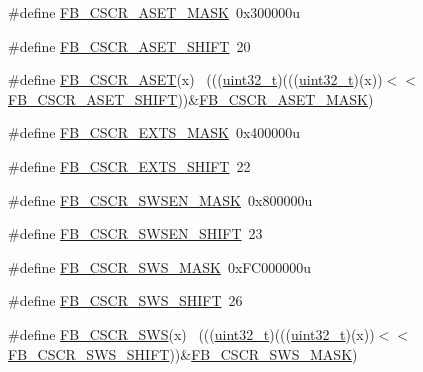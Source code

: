 \begin{DoxyCompactItemize}
\item 
\#define \hyperlink{group___f_b___register___masks_gaef9bac6317316a7b6d4e2df3526b206f}{F\+B\+\_\+\+C\+S\+C\+R\+\_\+\+A\+S\+E\+T\+\_\+\+M\+A\+SK}~0x300000u
\item 
\#define \hyperlink{group___f_b___register___masks_ga287d608bea3c47b85bdd3d707460da64}{F\+B\+\_\+\+C\+S\+C\+R\+\_\+\+A\+S\+E\+T\+\_\+\+S\+H\+I\+FT}~20
\item 
\#define \hyperlink{group___f_b___register___masks_gae8f1fb8db1ad4008018e37bb78c9338a}{F\+B\+\_\+\+C\+S\+C\+R\+\_\+\+A\+S\+ET}(x)                                                ~(((\hyperlink{_p_e___types_8h_a33594304e786b158f3fb30289278f5af}{uint32\+\_\+t})(((\hyperlink{_p_e___types_8h_a33594304e786b158f3fb30289278f5af}{uint32\+\_\+t})(x))$<$$<$\hyperlink{group___f_b___register___masks_ga287d608bea3c47b85bdd3d707460da64}{F\+B\+\_\+\+C\+S\+C\+R\+\_\+\+A\+S\+E\+T\+\_\+\+S\+H\+I\+FT}))\&\hyperlink{group___f_b___register___masks_gaef9bac6317316a7b6d4e2df3526b206f}{F\+B\+\_\+\+C\+S\+C\+R\+\_\+\+A\+S\+E\+T\+\_\+\+M\+A\+SK})
\item 
\#define \hyperlink{group___f_b___register___masks_ga1bc7960fd554faa076ba6e34fddaf081}{F\+B\+\_\+\+C\+S\+C\+R\+\_\+\+E\+X\+T\+S\+\_\+\+M\+A\+SK}~0x400000u
\item 
\#define \hyperlink{group___f_b___register___masks_ga095a10ba51cbcdf10aca9bf9d5692613}{F\+B\+\_\+\+C\+S\+C\+R\+\_\+\+E\+X\+T\+S\+\_\+\+S\+H\+I\+FT}~22
\item 
\#define \hyperlink{group___f_b___register___masks_ga38d5806081b68b58dff2b73abcab4d1a}{F\+B\+\_\+\+C\+S\+C\+R\+\_\+\+S\+W\+S\+E\+N\+\_\+\+M\+A\+SK}~0x800000u
\item 
\#define \hyperlink{group___f_b___register___masks_gad89987be24118d73c55bf5e97ab5e8d7}{F\+B\+\_\+\+C\+S\+C\+R\+\_\+\+S\+W\+S\+E\+N\+\_\+\+S\+H\+I\+FT}~23
\item 
\#define \hyperlink{group___f_b___register___masks_ga1036d22baaa692a66480d3ef93bc9729}{F\+B\+\_\+\+C\+S\+C\+R\+\_\+\+S\+W\+S\+\_\+\+M\+A\+SK}~0x\+F\+C000000u
\item 
\#define \hyperlink{group___f_b___register___masks_ga1ba720e1700a6ddc15457b55d8fbb376}{F\+B\+\_\+\+C\+S\+C\+R\+\_\+\+S\+W\+S\+\_\+\+S\+H\+I\+FT}~26
\item 
\#define \hyperlink{group___f_b___register___masks_ga88bb14898062706f58a15f988c6aad47}{F\+B\+\_\+\+C\+S\+C\+R\+\_\+\+S\+WS}(x)                                                  ~(((\hyperlink{_p_e___types_8h_a33594304e786b158f3fb30289278f5af}{uint32\+\_\+t})(((\hyperlink{_p_e___types_8h_a33594304e786b158f3fb30289278f5af}{uint32\+\_\+t})(x))$<$$<$\hyperlink{group___f_b___register___masks_ga1ba720e1700a6ddc15457b55d8fbb376}{F\+B\+\_\+\+C\+S\+C\+R\+\_\+\+S\+W\+S\+\_\+\+S\+H\+I\+FT}))\&\hyperlink{group___f_b___register___masks_ga1036d22baaa692a66480d3ef93bc9729}{F\+B\+\_\+\+C\+S\+C\+R\+\_\+\+S\+W\+S\+\_\+\+M\+A\+SK})

\end{DoxyCompactItemize}
